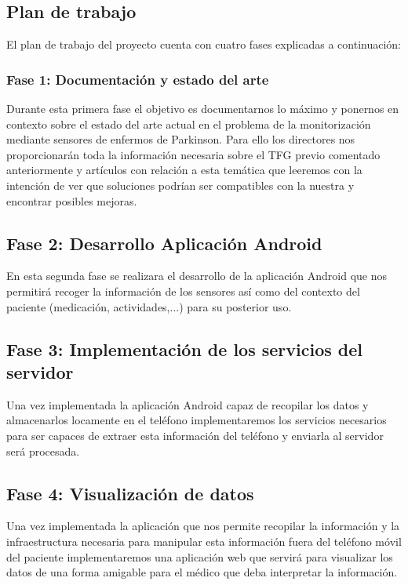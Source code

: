 \documentclass[11pt,spanish]{article}
\begin{document}
\subsection{Plan de trabajo}
El plan de trabajo del proyecto cuenta con cuatro fases explicadas a continuación:

\subsubsection{Fase 1: Documentación y estado del arte}
Durante esta primera fase el objetivo es documentarnos lo máximo y ponernos en contexto sobre el estado del arte actual en el problema de la monitorización mediante sensores de enfermos de Parkinson. Para ello los directores nos proporcionarán toda la información necesaria sobre el TFG previo comentado anteriormente y artículos con relación a esta temática que leeremos con la intención de ver que soluciones podrían ser compatibles con la nuestra y encontrar posibles mejoras.

\subsection{Fase 2: Desarrollo Aplicación Android}
En esta segunda fase se realizara el desarrollo de la aplicación Android que nos permitirá recoger la información de los sensores así como del contexto del paciente (medicación, actividades,...) para su posterior uso.

\subsection{Fase 3: Implementación de los servicios del servidor}
Una vez implementada la aplicación Android capaz de recopilar los datos y almacenarlos locamente en el teléfono implementaremos los servicios necesarios para ser capaces de extraer esta información del teléfono y enviarla al servidor será procesada.

\subsection{Fase 4: Visualización de datos}
Una vez implementada la aplicación que nos permite recopilar la información y la infraestructura necesaria para manipular esta información fuera del teléfono móvil del paciente implementaremos una aplicación web que servirá para visualizar los datos de una forma amigable para el médico que deba interpretar la información.
\end{document}
